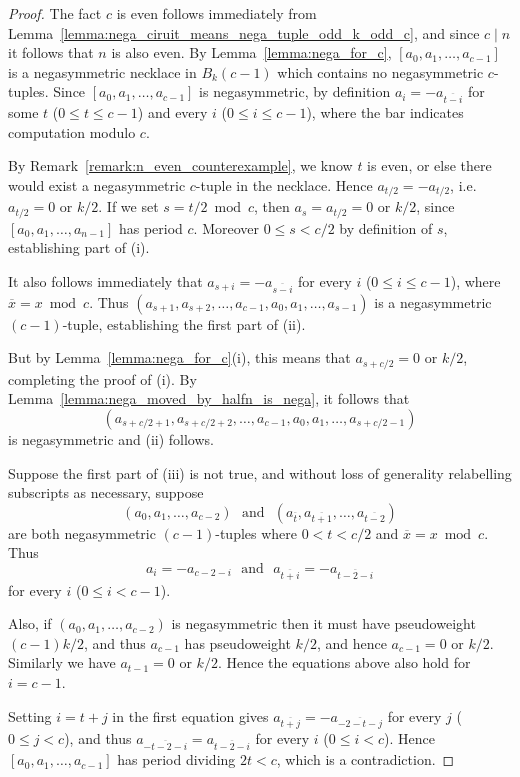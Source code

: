 \documentclass[10pt,a4paper]{amsart}
\begin{document}
\begin{proof}
The fact $c$ is even follows immediately from
    Lemma~\ref{lemma:nega_ciruit_means_nega_tuple_odd_k_odd_c}, and since $c\mid n$ it follows that
    $n$ is also even. By Lemma~\ref{lemma:nega_for_c}, $[a_0,a_1,\dots,a_{c-1}]$ is a
    negasymmetric necklace in $B_k(c-1)$ which contains no negasymmetric $c$-tuples. Since
    $[a_0,a_1,\dots,a_{c-1}]$ is negasymmetric, by definition $a_{i}=-a_{\overline{t-i}}$ for
    some $t$ ($0\leq t\leq c-1$) and every $i$ ($0\leq i\leq c-1$), where the bar indicates
    computation modulo $c$.

By Remark~\ref{remark:n_even_counterexample}, we know $t$ is even, or else there would exist a
    negasymmetric $c$-tuple in the necklace. Hence $a_{t/2}=-a_{t/2}$, i.e.\ $a_{t/2}=0$ or $k/2$.  If we
    set $s=t/2\bmod c$, then $a_{s}=a_{t/2}=0$ or $k/2$, since $[a_0,a_1,\dots,a_{n-1}]$ has period $c$.
    Moreover $0\leq s<c/2$ by definition of $s$, establishing part of (i).

It also follows immediately that $a_{s+i}=-a_{\overline{s-i}}$ for every $i$ ($0\leq i\leq
    c-1$), where $\overline{x}=x\bmod c$.  Thus
    $(a_{s+1},a_{s+2},\dots,a_{c-1},a_0,a_1,\dots,a_{s-1})$ is a negasymmetric $(c-1)$-tuple,
    establishing the first part of (ii).

But by Lemma~\ref{lemma:nega_for_c}(i), this means that $a_{s+c/2}=0$ or $k/2$, completing the
proof of (i). By Lemma~\ref{lemma:nega_moved_by_halfn_is_nega}, it follows that
\[ (a_{s+c/2+1},a_{s+c/2+2},\dots,a_{c-1},a_0,a_1,\dots,a_{s+c/2-1}) \]
is negasymmetric and (ii) follows.

Suppose the first part of (iii) is not true, and without loss of generality relabelling subscripts
as necessary, suppose
\[ (a_0,a_1,\dots,a_{c-2}) \text{~~and~~}
(a_{\overline{t}},a_{\overline{t+1}},\dots,a_{\overline{t-2}}) \]
are both negasymmetric
$(c-1)$-tuples where $0<t<c/2$ and $\overline{x}=x\bmod c$.  Thus
\[ a_i=-a_{c-2-i} \text{~~and~~} a_{\overline{t+i}}=-a_{\overline{t-2-i}} \]
for every $i$ ($0\leq i<c-1$).

Also, if $(a_0,a_1,\dots,a_{c-2})$ is negasymmetric then it must have pseudoweight
 $(c-1)k/2$, and thus $a_{c-1}$ has pseudoweight
$k/2$, and hence $a_{c-1}=0$ or $k/2$. Similarly we have $a_{t-1}=0$ or $k/2$. Hence the equations
above also hold for $i=c-1$.

Setting $i=t+j$ in the first equation gives $a_{\overline{t+j}}=-a_{\overline{-2-t-j}}$ for every
$j$ ($0\leq j<c$), and thus $a_{\overline{-t-2-i}}=a_{\overline{t-2-i}}$ for every $i$ ($0\leq
i<c$). Hence $[a_0,a_1,\dots,a_{c-1}]$ has period dividing $2t<c$, which is a contradiction.


\end{proof}
\end{document}
